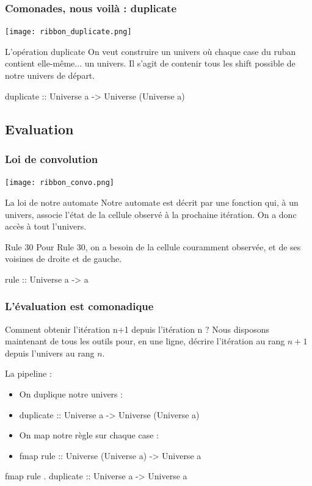 \documentclass{beamer}
\begin{document}
\begin{frame}
\frametitle{Comonades, nous voilà : duplicate}
\begin{center}
\texttt{[image: ribbon\_duplicate.png]}
\end{center}

\begin{block}{L'opération duplicate}
On veut construire un univers où chaque case du ruban contient elle-même... un univers. Il s'agit de contenir tous les shift possible de notre univers de départ.
\end{block}

\begin{block}{}
duplicate :: Universe a -> Universe (Universe a)
\end{block}
\end{frame}

\subsection{Evaluation}

\begin{frame}
\frametitle{Loi de convolution}
\begin{center}
\texttt{[image: ribbon\_convo.png]}
\end{center}
\begin{block}{La loi de notre automate}
Notre automate est décrit par une fonction qui, à un univers, associe l'état de la cellule observé à la prochaine itération. On a donc accès à tout l'univers.
\end{block}
\pause
\begin{block}{Rule 30}
Pour Rule 30, on a besoin de la cellule couramment observée, et de ses voisines de droite et de gauche.
\end{block}
\pause
\begin{exampleblock}{}
rule :: Universe a -> a
\end{exampleblock}
\end{frame}

\begin{frame}
\frametitle{L'évaluation est comonadique}
\begin{alertblock}{Comment obtenir l'itération n+1 depuis l'itération n ?}
Nous disposons maintenant de tous les outils pour, en une ligne, décrire l'itération au rang $n+1$ depuis l'univers au rang $n$.
\end{alertblock}
\pause
\begin{block}{La pipeline :}
\begin{itemize}
\item On duplique notre univers :
\item[] duplicate :: Universe a -> Universe (Universe a)
\item On map notre règle sur chaque case :
\item[] fmap rule :: Universe (Universe a) -> Universe a
\end{itemize}
\pause
\end{block}
\begin{exampleblock}{}
fmap rule . duplicate :: Universe a -> Universe a
\end{exampleblock}
\end{frame}
\end{document}
